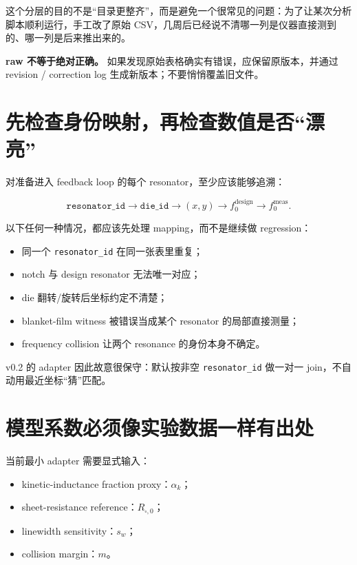 这个分层的目的不是“目录更整齐”，而是避免一个很常见的问题：为了让某次分析脚本顺利运行，手工改了原始 CSV，几周后已经说不清哪一列是仪器直接测到的、哪一列是后来推出来的。

\begin{warningbox}
\textbf{raw 不等于绝对正确。} 如果发现原始表格确实有错误，应保留原版本，并通过 revision / correction log 生成新版本；不要悄悄覆盖旧文件。
\end{warningbox}

\section{先检查身份映射，再检查数值是否“漂亮”}

对准备进入 feedback loop 的每个 resonator，至少应该能够追溯：

\[
\texttt{resonator\_id}
\rightarrow
\texttt{die\_id}
\rightarrow
(x,y)
\rightarrow
f_0^{\mathrm{design}}
\rightarrow
f_0^{\mathrm{meas}}.
\]

以下任何一种情况，都应该先处理 mapping，而不是继续做 regression：

\begin{itemize}
  \item 同一个 \texttt{resonator\_id} 在同一张表里重复；
  \item notch 与 design resonator 无法唯一对应；
  \item die 翻转/旋转后坐标约定不清楚；
  \item blanket-film witness 被错误当成某个 resonator 的局部直接测量；
  \item frequency collision 让两个 resonance 的身份本身不确定。
\end{itemize}

v0.2 的 adapter 因此故意很保守：默认按非空 \texttt{resonator\_id} 做一对一 join，不自动用最近坐标“猜”匹配。

\section{模型系数必须像实验数据一样有出处}

当前最小 adapter 需要显式输入：

\begin{itemize}
  \item kinetic-inductance fraction proxy：$\alpha_k$；
  \item sheet-resistance reference：$R_{\square,0}$；
  \item linewidth sensitivity：$s_w$；
  \item collision margin：$m$。
\end{itemize}

